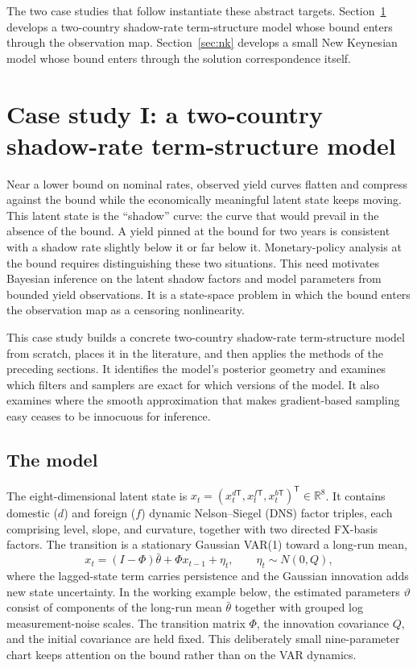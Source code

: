 \documentclass[11pt]{article}
\begin{document}
The two case studies that follow instantiate these abstract targets.
Section~\ref{sec:shadow} develops a two-country shadow-rate term-structure
model whose bound enters through the observation map. Section~\ref{sec:nk}
develops a small New Keynesian model whose bound enters through the solution
correspondence itself.

\section{Case study I: a two-country shadow-rate term-structure model}
\label{sec:shadow}

Near a lower bound on nominal rates, observed yield curves flatten and
compress against the bound while the economically meaningful latent state
keeps moving. This latent state is the ``shadow'' curve: the curve that would
prevail in the absence of the bound. A yield pinned at the bound for two years
is consistent with a shadow rate slightly below it or far below it.
Monetary-policy analysis at the bound requires distinguishing these two
situations. This need motivates Bayesian inference on the latent shadow
factors and model parameters from bounded yield observations. It is a
state-space problem in which the bound enters the observation map as a
censoring nonlinearity.

This case study builds a concrete two-country shadow-rate term-structure model
from scratch, places it in the literature, and then applies the methods of the
preceding sections. It identifies the model's posterior geometry and examines
which filters and samplers are exact for which versions of the model. It also
examines where the smooth approximation that makes gradient-based sampling
easy ceases to be innocuous for inference.

\subsection{The model}
\label{sec:shadow-model}

The eight-dimensional latent state is
\(x_t=(x_t^{d\mathsf T},x_t^{f\mathsf T},x_t^{b\mathsf T})^{\mathsf T}
\in\mathbb R^8\). It contains domestic (\(d\)) and foreign (\(f\)) dynamic Nelson--Siegel (DNS) factor triples, each comprising level, slope, and curvature, together with two directed FX-basis factors. The transition is a stationary Gaussian VAR(1) toward a long-run mean,
\begin{equation}\label{eq:75}
 x_t=(I-\Phi)\bar\theta+\Phi x_{t-1}+\eta_t,
 \qquad \eta_t\sim N(0,Q),
\end{equation}
where the lagged-state term carries persistence and the Gaussian innovation adds new state uncertainty. In the working example below, the estimated parameters \(\vartheta\) consist of components of the long-run mean \(\bar\theta\) together with grouped log measurement-noise scales. The transition matrix \(\Phi\), the innovation covariance \(Q\), and the initial covariance are held fixed. This deliberately small nine-parameter chart keeps attention on the bound rather than on the VAR dynamics.
\end{document}
